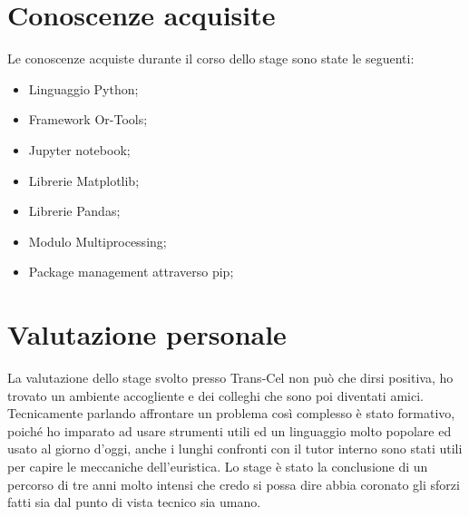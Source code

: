 \section{Conoscenze acquisite}
Le conoscenze acquiste durante il corso dello stage sono state le seguenti:
\begin{itemize}
	\item Linguaggio Python;
	\item Framework Or-Tools;
	\item Jupyter notebook;
	\item Librerie Matplotlib;
	\item Librerie Pandas;
	\item Modulo Multiprocessing;
	\item Package management attraverso pip;
\end{itemize}

\section{Valutazione personale}
La valutazione dello stage svolto presso Trans-Cel non può che dirsi positiva, ho trovato un ambiente accogliente e dei colleghi che sono poi diventati amici. Tecnicamente parlando affrontare un problema così complesso è stato formativo, poiché ho imparato ad usare strumenti utili ed un linguaggio molto popolare ed usato al giorno d'oggi, anche i lunghi confronti con il tutor interno sono stati utili per capire le meccaniche dell'euristica. Lo stage è stato la conclusione di un percorso di tre anni molto intensi che credo si possa dire abbia coronato gli sforzi fatti sia dal punto di vista tecnico sia umano.